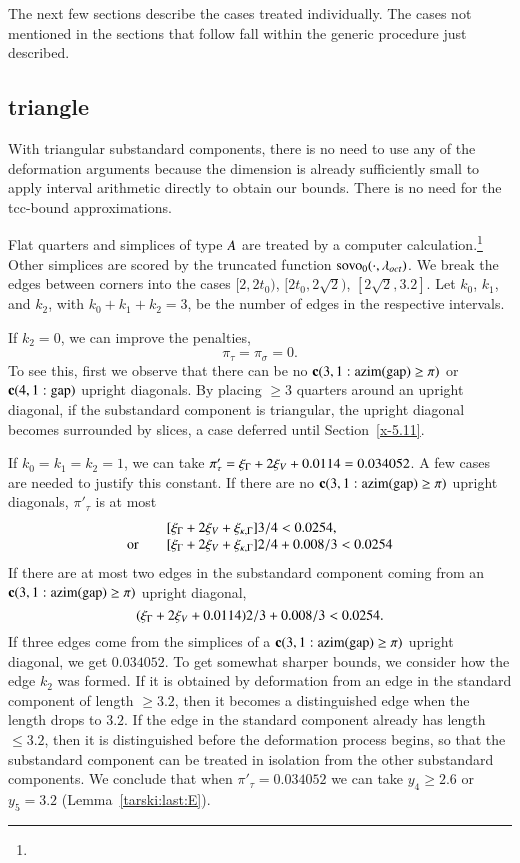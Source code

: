 The next few sections describe the cases treated individually. The cases
not mentioned in the sections that follow fall within the generic
procedure just described.

\subsection{triangle} %

With triangular substandard components, there is no need to use any of the
deformation arguments because the dimension is already sufficiently
small to apply interval arithmetic directly to obtain our bounds.
There is no need for the tcc-bound approximations.

Flat quarters and simplices of type $A$ are treated by a computer
calculation.\footnote{} %
Other simplices are scored by the truncated function
${\operatorname{sovo}}_0(\cdot,\lambda_{oct})$. We break the edges between corners into the cases
    $[2,2t_0)$, $[2t_0,2\sqrt{2})$, $[2\sqrt{2},3.2]$.
Let $k_0$, $k_1$, and $k_2$, with $k_0+k_1+k_2=3$, be the number
of edges  in the respective intervals.

If $k_2=0$, we can improve the penalties,
    $$\pi_\tau = \pi_\sigma=0.$$
To see this, first we observe that there can be no ${\operatorname{\bf c}}{(3,1: {\operatorname{azim}}({\operatorname{gap}}) \ge \pi)}$ or
${\operatorname{\bf c}}{(4,1:{\operatorname{gap}})}$ upright diagonals. By placing $\ge3$ quarters around
an upright diagonal, if the substandard component is triangular, the upright
diagonal becomes surrounded by slices, a case deferred
until Section~\ref{x-5.11}.

If $k_0=k_1=k_2=1$, we can take $\pi'_\tau=
\xi_\Gamma+2\xi_V+0.0114=0.034052$. A few cases are needed to justify
this constant. If there are no ${\operatorname{\bf c}}{(3,1: {\operatorname{azim}}({\operatorname{gap}}) \ge \pi)}$ upright diagonals,
$\pi'_\tau$ is at most
    $$
    \begin{array}{lll}
    &[\xi_\Gamma + 2 \xi_V +\xi_{\kappa,\Gamma} ]3/4 < 0.0254,\\
    \hbox{or\quad }&[\xi_\Gamma+2\xi_V+\xi_{\kappa,\Gamma}]2/4 + 0.008/3 < 0.0254
    \end{array}
    $$
If there are at most two edges in the substandard component coming from an
${\operatorname{\bf c}}{(3,1: {\operatorname{azim}}({\operatorname{gap}}) \ge \pi)}$ upright diagonal,
    $$(\xi_\Gamma+2\xi_V+0.0114)2/3 + 0.008/3 < 0.0254.$$
If three edges come from the simplices of a ${\operatorname{\bf c}}{(3,1: {\operatorname{azim}}({\operatorname{gap}}) \ge \pi)}$ upright
diagonal, we get $0.034052$. To get somewhat sharper bounds, we
consider how the edge $k_2$ was formed.  If it is obtained by
deformation from an edge in the standard component of length
$\ge3.2$, then it becomes a distinguished edge when the length
drops to $3.2$.  If the edge in the standard component already has
length $\le3.2$, then it is distinguished before the deformation
process begins, so that the substandard component can be treated in isolation
from the other substandard components. We conclude that when
$\pi'_\tau=0.034052$ we can take $y_4\ge2.6$ or $y_5=3.2$
(Lemma~\ref{tarski:last:E}).

